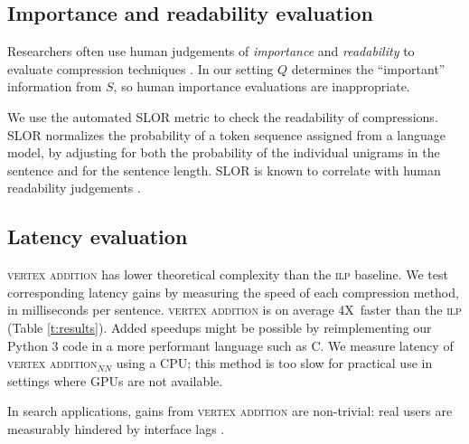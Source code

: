 \documentclass[11pt,a4paper]{article}
\newcommand{\speedup}[0]{4X~}
\begin{document}
\subsection{Importance and readability evaluation}\label{s:readabilityinformativeness}

Researchers often use human judgements of \textit{importance} and \textit{readability} to evaluate compression techniques \cite{Knight2000StatisticsBasedS,filippova2015sentence}. In our setting $Q$ determines the ``important'' information from $S$, so human importance evaluations are inappropriate.

We use the automated SLOR metric \cite{lau2015unsupervised} to check the readability of compressions. SLOR normalizes the probability of a token sequence assigned from a language model, by adjusting for both the probability of the individual unigrams in the sentence and for the sentence length.
SLOR is known to correlate with human readability judgements \cite{kannConl}.  

\subsection{Latency evaluation}\label{s:costs}

\textsc{vertex addition} has lower theoretical complexity than the \textsc{ilp} baseline. We test corresponding latency gains by measuring the speed of each compression method, in milliseconds per sentence. \textsc{vertex addition} is on average \speedup faster than the \textsc{ilp} (Table \ref{t:results}). Added speedups might be possible by reimplementing our Python 3 code in a more performant language such as C. We measure latency of \textsc{vertex addition}$_{NN}$ using a CPU; this method is too slow for practical use in settings where GPUs are not available.

In search applications, gains from \textsc{vertex addition} are non-trivial: real users are measurably hindered by interface lags \cite{Nielsen,heerschei,Liu2014TheEO}. 
\end{document}
